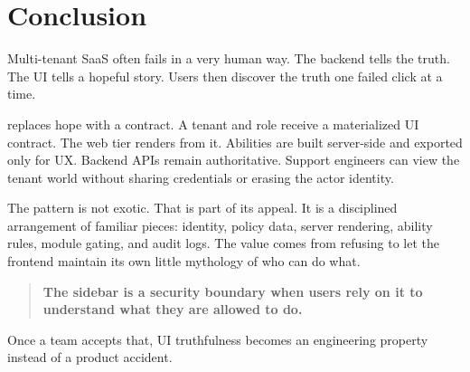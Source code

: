 \section{Conclusion}
\label{sec:conclusion}

Multi-tenant SaaS often fails in a very human way. The backend tells the truth. The UI tells a hopeful story. Users then discover the truth one failed click at a time.

\uiPolicy{} replaces hope with a contract. A tenant and role receive a materialized UI contract. The web tier renders from it. Abilities are built server-side and exported only for UX. Backend APIs remain authoritative. Support engineers can view the tenant world without sharing credentials or erasing the actor identity.

The pattern is not exotic. That is part of its appeal. It is a disciplined arrangement of familiar pieces: identity, policy data, server rendering, ability rules, module gating, and audit logs. The value comes from refusing to let the frontend maintain its own little mythology of who can do what.

\begin{quote}
\textbf{The sidebar is a security boundary when users rely on it to understand what they are allowed to do.}
\end{quote}

Once a team accepts that, UI truthfulness becomes an engineering property instead of a product accident.
